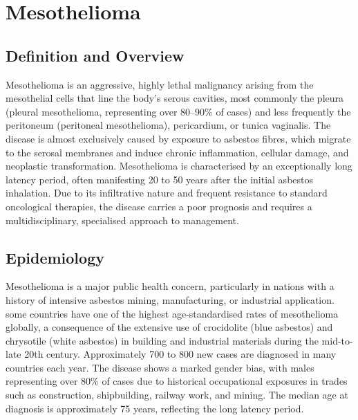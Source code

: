 \chapter{Mesothelioma}

\section*{Definition and Overview}
Mesothelioma is an aggressive, highly lethal malignancy arising from the mesothelial cells that line the body's serous cavities, most commonly the pleura (pleural mesothelioma, representing over 80--90\% of cases) and less frequently the peritoneum (peritoneal mesothelioma), pericardium, or tunica vaginalis. The disease is almost exclusively caused by exposure to asbestos fibres, which migrate to the serosal membranes and induce chronic inflammation, cellular damage, and neoplastic transformation. Mesothelioma is characterised by an exceptionally long latency period, often manifesting 20 to 50 years after the initial asbestos inhalation. Due to its infiltrative nature and frequent resistance to standard oncological therapies, the disease carries a poor prognosis and requires a multidisciplinary, specialised approach to management.

\section*{Epidemiology}
Mesothelioma is a major public health concern, particularly in nations with a history of intensive asbestos mining, manufacturing, or industrial application. some countries have one of the highest age-standardised rates of mesothelioma globally, a consequence of the extensive use of crocidolite (blue asbestos) and chrysotile (white asbestos) in building and industrial materials during the mid-to-late 20th century. Approximately 700 to 800 new cases are diagnosed in many countries each year. The disease shows a marked gender bias, with males representing over 80\% of cases due to historical occupational exposures in trades such as construction, shipbuilding, railway work, and mining. The median age at diagnosis is approximately 75 years, reflecting the long latency period.

